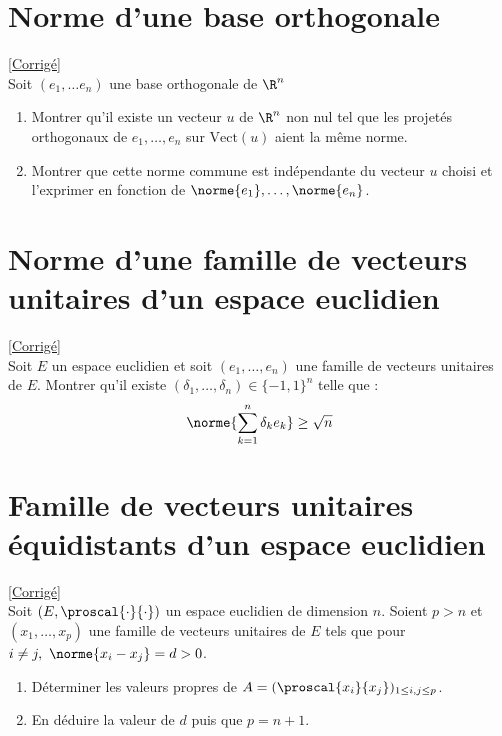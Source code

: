 \documentclass[8pt]{book}
\begin{document}
\section{Norme d'une base orthogonale }
\label{Norme d'une base orthogonale}
\textcolor{blue}{\hyperref[Norme d'une base orthogonale corrigé]{[Corrigé]}}\\
Soit $(e_1,\dots e_n)$ une base orthogonale de $\R^n$
\begin{enumerate}
	\item Montrer qu'il existe un vecteur $u$ de $\R^n$ non nul tel que les projetés orthogonaux de $e_1,\dots,e_n$ sur $\text{Vect}(u)$ aient la même norme.
	\item Montrer que cette norme commune est indépendante du vecteur $u$ choisi et l'exprimer en fonction de $\norme{e_1},\dots,\norme{e_n}$.
\end{enumerate}

\section{Norme d'une famille de vecteurs unitaires d'un espace euclidien }
\label{Norme d'une famille de vecteurs unitaires d'un espace euclidien}
\textcolor{blue}{\hyperref[Norme d'une famille de vecteurs unitaires d'un espace euclidien corrigé]{[Corrigé]}}\\
Soit $E$ un espace euclidien et soit $(e_1,\dots,e_n)$ une famille de vecteurs unitaires de $E$. Montrer qu'il existe $(\delta_1,\dots,\delta_n)\in \{-1,1\}^n$ telle que :
$$\norme{\sum_{k=1}^n\delta_ke_k}\geq \sqrt n$$

\section{Famille de vecteurs unitaires équidistants d'un espace euclidien }
\label{Famille de vecteurs unitaires équidistants d'un espace euclidien}
\textcolor{blue}{\hyperref[Famille de vecteurs unitaires équidistants d'un espace euclidien corrigé]{[Corrigé]}}\\
Soit $(E,\proscal{\cdot}{\cdot})$ un espace euclidien de dimension $n$. Soient $p>n$ et $(x_1,\dots,x_p)$ une famille de vecteurs unitaires de $E$ tels que pour $i\ne j,\ \norme{x_i-x_j}=d>0$.
\begin{enumerate}
	\item Déterminer les valeurs propres de $A=(\proscal{x_i}{x_j})_{1\leq i,j\leq p}$.
	\item En déduire la valeur de $d$ puis que $p=n+1$.
\end{enumerate}
\end{document}
